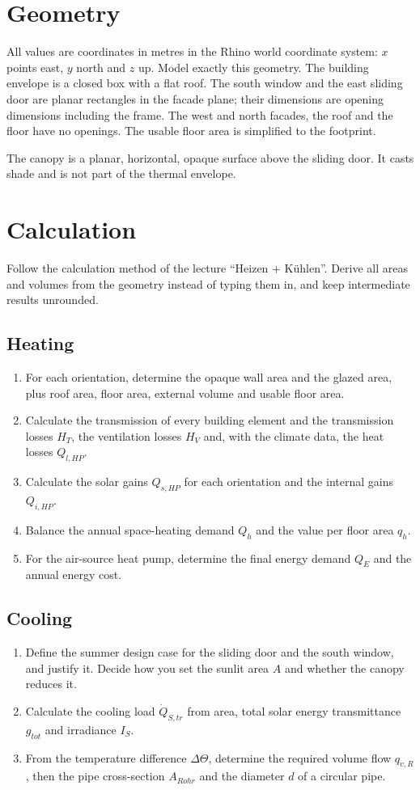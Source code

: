 \section{Geometry}
All values are coordinates in metres in the Rhino world coordinate system: $x$ points east, $y$ north and $z$ up. Model exactly this geometry.
\EnergyAxonometryFigure
\EnergyElements
The building envelope is a closed box with a flat roof. The south window and the east sliding door are planar rectangles in the facade plane; their dimensions are opening dimensions including the frame. The west and north facades, the roof and the floor have no openings. The usable floor area is simplified to the footprint.

The canopy is a planar, horizontal, opaque surface above the sliding door. It casts shade and is not part of the thermal envelope.
\section{Calculation}
Follow the calculation method of the lecture “Heizen + Kühlen”. Derive all areas and volumes from the geometry instead of typing them in, and keep intermediate results unrounded.
\subsection{Heating}
\begin{enumerate}
\item For each orientation, determine the opaque wall area and the glazed area, plus roof area, floor area, external volume and usable floor area.
\item Calculate the transmission of every building element and the transmission losses $H_T$, the ventilation losses $H_V$ and, with the climate data, the heat losses $Q_{l,HP}$.
\item Calculate the solar gains $Q_{s,HP}$ for each orientation and the internal gains $Q_{i,HP}$.
\item Balance the annual space-heating demand $Q_h$ and the value per floor area $q_h$.
\item For the air-source heat pump, determine the final energy demand $Q_E$ and the annual energy cost.
\end{enumerate}
\subsection{Cooling}
\begin{enumerate}
\item Define the summer design case for the sliding door and the south window, and justify it. Decide how you set the sunlit area $A$ and whether the canopy reduces it.
\item Calculate the cooling load $\dot Q_{S,tr}$ from area, total solar energy transmittance $g_{tot}$ and irradiance $I_S$.
\item From the temperature difference $\Delta\Theta$, determine the required volume flow $q_{v,R}$, then the pipe cross-section $A_{Rohr}$ and the diameter $d$ of a circular pipe.
\end{enumerate}
